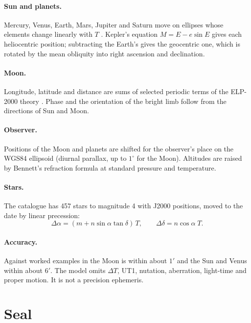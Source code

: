 \documentclass[10pt,twocolumn,a4paper]{article}
\begin{document}
\paragraph{Sun and planets.} Mercury, Venus, Earth, Mars, Jupiter and Saturn
move on ellipses whose elements change linearly with $T$
\cite{simon1994numerical}. Kepler's equation $M=E-e\sin E$ gives each
heliocentric position; subtracting the Earth's gives the geocentric one,
which is rotated by the mean obliquity into right ascension and declination.

\paragraph{Moon.} Longitude, latitude and distance are sums of selected
periodic terms of the ELP-2000 theory \cite{chapront1983elp}. Phase and the
orientation of the bright limb follow from the directions of Sun and Moon.

\paragraph{Observer.} Positions of the Moon and planets are shifted for the
observer's place on the WGS84 ellipsoid (diurnal parallax, up to $1^\circ$
for the Moon). Altitudes are raised by Bennett's refraction formula at
standard pressure and temperature.

\paragraph{Stars.} The catalogue has 457 stars to magnitude 4 with J2000
positions, moved to the date by linear precession:
\begin{equation}
\Delta\alpha = (m + n\sin\alpha\tan\delta)\,T, \qquad
\Delta\delta = n\cos\alpha\;T .
\end{equation}

\paragraph{Accuracy.} Against worked examples in \cite{meeus1998astronomical}
the Moon is within about $1'$ and the Sun and Venus within about $6'$. The
model omits $\Delta T$, UT1, nutation, aberration, light-time and proper
motion. It is not a precision ephemeris.

\section{Seal}
\end{document}

